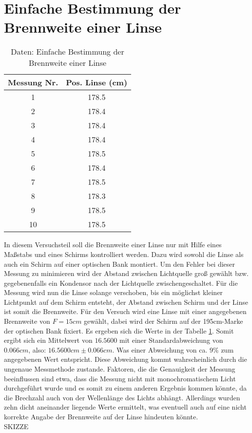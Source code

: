 \section{Einfache Bestimmung der Brennweite einer Linse}
\begin{table}[]
    \centering
    \begin{tabular}{|c|c|}
    	\hline
    	Messung Nr. & Pos. Linse (cm) \\
    	\hline
    	1 & 178.5 \\
    	\hline
    	2 & 178.4 \\
    	\hline
    	3 & 178.4 \\
    	\hline
    	4 & 178.4 \\
    	\hline
    	5 & 178.5 \\
    	\hline
    	6 & 178.4 \\
    	\hline
    	7 & 178.5 \\
    	\hline
    	8 & 178.3 \\
    	\hline
    	9 & 178.5 \\
    	\hline
    	10 & 178.5 \\
    	\hline
    
    \end{tabular}
    \caption{Daten: Einfache Bestimmung der Brennweite einer Linse}
    \label{tab:Daten1}
\end{table}


In diesem Versuchsteil soll die Brennweite einer Linse nur mit Hilfe eines Maßstabs und eines Schirms kontrolliert werden. Dazu wird sowohl die Linse als auch ein Schirm auf einer optischen Bank montiert. Um den Fehler bei dieser Messung zu minimieren wird der Abstand zwischen Lichtquelle groß gewählt bzw. gegebenenfalls ein Kondensor nach der Lichtquelle zwischengeschaltet. Für die Messung wird nun die Linse solange verschoben, bis ein möglichst kleiner Lichtpunkt auf dem Schirm entsteht, der Abstand zwischen Schirm und der Linse ist somit die Brennweite. Für den Versuch wird eine Linse mit einer angegebenen Brennweite von $F = 15 cm$ gewählt, dabei wird der Schirm auf der 195cm-Marke der optischen Bank fixiert. Es ergeben sich die Werte in der Tabelle \ref{tab:Daten1}. Somit ergibt sich ein Mittelwert von $16.5600$ mit einer Standardabweichung von $0.066cm$, also: $16.5600cm \pm 0.066cm$. Was einer Abweichung von ca. $9 \% $ zum angegebenen Wert entspricht. Diese Abweichung kommt wahrscheinlich durch die ungenaue Messmethode zustande. Faktoren, die die Genauigkeit der Messung beeinflussen sind etwa, dass die Messung nicht mit monochromatischem Licht durchgeführt wurde und es somit zu einem anderen Ergebnis kommen könnte, da die Brechzahl auch von der Wellenlänge des Lichts abhängt. Allerdings wurden zehn dicht aneinander liegende Werte ermittelt, was eventuell auch auf eine nicht korrekte Angabe der Brennweite auf der Linse hindeuten könnte.
\\
SKIZZE

